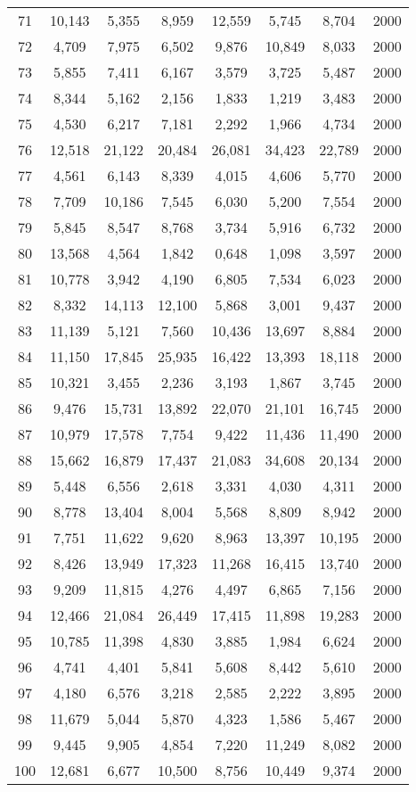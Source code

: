 \begin{longtable}{cccccccc}
71  & 10,143 & 5,355  & 8,959  & 12,559 & 5,745  & 8,704  & 2000 \\
72  & 4,709  & 7,975  & 6,502  & 9,876  & 10,849 & 8,033  & 2000 \\
73  & 5,855  & 7,411  & 6,167  & 3,579  & 3,725  & 5,487  & 2000 \\
74  & 8,344  & 5,162  & 2,156  & 1,833  & 1,219  & 3,483  & 2000 \\
75  & 4,530  & 6,217  & 7,181  & 2,292  & 1,966  & 4,734  & 2000 \\
76  & 12,518 & 21,122 & 20,484 & 26,081 & 34,423 & 22,789 & 2000 \\
77  & 4,561  & 6,143  & 8,339  & 4,015  & 4,606  & 5,770  & 2000 \\
78  & 7,709  & 10,186 & 7,545  & 6,030  & 5,200  & 7,554  & 2000 \\
79  & 5,845  & 8,547  & 8,768  & 3,734  & 5,916  & 6,732  & 2000 \\
80  & 13,568 & 4,564  & 1,842  & 0,648  & 1,098  & 3,597  & 2000 \\
81  & 10,778 & 3,942  & 4,190  & 6,805  & 7,534  & 6,023  & 2000 \\
82  & 8,332  & 14,113 & 12,100 & 5,868  & 3,001  & 9,437  & 2000 \\
83  & 11,139 & 5,121  & 7,560  & 10,436 & 13,697 & 8,884  & 2000 \\
84  & 11,150 & 17,845 & 25,935 & 16,422 & 13,393 & 18,118 & 2000 \\
85  & 10,321 & 3,455  & 2,236  & 3,193  & 1,867  & 3,745  & 2000 \\
86  & 9,476  & 15,731 & 13,892 & 22,070 & 21,101 & 16,745 & 2000 \\
87  & 10,979 & 17,578 & 7,754  & 9,422  & 11,436 & 11,490 & 2000 \\
88  & 15,662 & 16,879 & 17,437 & 21,083 & 34,608 & 20,134 & 2000 \\
89  & 5,448  & 6,556  & 2,618  & 3,331  & 4,030  & 4,311  & 2000 \\
90  & 8,778  & 13,404 & 8,004  & 5,568  & 8,809  & 8,942  & 2000 \\
91  & 7,751  & 11,622 & 9,620  & 8,963  & 13,397 & 10,195 & 2000 \\
92  & 8,426  & 13,949 & 17,323 & 11,268 & 16,415 & 13,740 & 2000 \\
93  & 9,209  & 11,815 & 4,276  & 4,497  & 6,865  & 7,156  & 2000 \\
94  & 12,466 & 21,084 & 26,449 & 17,415 & 11,898 & 19,283 & 2000 \\
95  & 10,785 & 11,398 & 4,830  & 3,885  & 1,984  & 6,624  & 2000 \\
96  & 4,741  & 4,401  & 5,841  & 5,608  & 8,442  & 5,610  & 2000 \\
97  & 4,180  & 6,576  & 3,218  & 2,585  & 2,222  & 3,895  & 2000 \\
98  & 11,679 & 5,044  & 5,870  & 4,323  & 1,586  & 5,467  & 2000 \\
99  & 9,445  & 9,905  & 4,854  & 7,220  & 11,249 & 8,082  & 2000 \\
100 & 12,681 & 6,677  & 10,500 & 8,756  & 10,449 & 9,374  & 2000 \\ \hline
\end{longtable}
